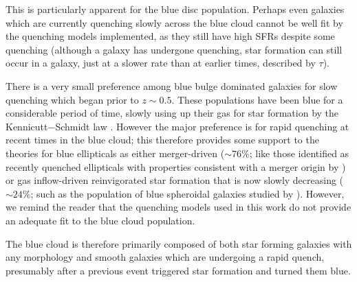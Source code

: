 This is particularly apparent for the blue disc population. Perhaps even galaxies which are currently quenching slowly across the blue cloud cannot be well fit by the quenching models implemented, as they still have high SFRs despite some quenching (although a galaxy has undergone quenching, star formation can still occur in a galaxy, just at a slower rate than at earlier times, described by $\tau$).


There is a very small preference among blue bulge dominated galaxies for slow quenching which began prior to $z \sim 0.5 $. These populations have been blue for a considerable period of time, slowly using up their gas for star formation by the Kennicutt$-$Schmidt law \citep{Schmidt59, Kennicutt97}. However the major preference is for rapid quenching at recent times in the blue cloud; this therefore provides some support to the theories for blue ellipticals as either merger-driven ($\sim76\%$; like those identified as recently quenched ellipticals with properties consistent with a merger origin by \citealt{McIntosh14}) or gas inflow-driven reinvigorated star formation that is now slowly decreasing ($\sim24\%$; such as the population of blue spheroidal galaxies studied by \citealt{Kaviraj13}). However, we remind the reader that the quenching models used in this work do not provide an adequate fit to the blue cloud population.

The blue cloud is therefore primarily composed of both star forming galaxies with any morphology and smooth galaxies which are undergoing a rapid quench, presumably after a previous event triggered star formation and turned them blue.

